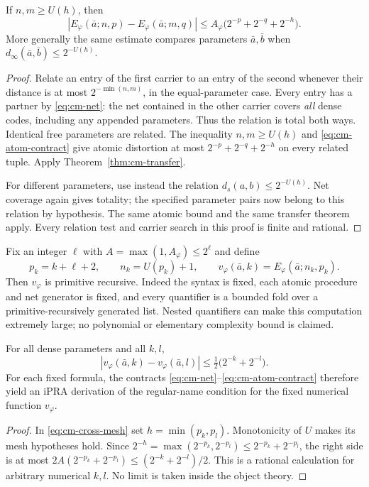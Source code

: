 \begin{theorem}
\label{thm:cm-cross-mesh}
If $n,m\geq U(h)$, then
\begin{equation}
 |E_\varphi(\bar a;n,p)-E_\varphi(\bar a;m,q)|
 \leq A_\varphi\bigl(2^{-p}+2^{-q}+2^{-h}\bigr).
 \label{eq:cm-cross-mesh}
\end{equation}
More generally the same estimate compares parameters $\bar a,\bar b$
when $d_\infty(\bar a,\bar b)\leq2^{-U(h)}$.
\end{theorem}
\begin{proof}
Relate an entry of the first carrier to an entry of the second whenever
their distance is at most $2^{-\min(n,m)}$, in the equal-parameter
case. Every entry has a partner by \eqref{eq:cm-net}: the net contained
in the other carrier covers \emph{all} dense codes, including any
appended parameters. Thus the relation is total both ways.
Identical free parameters are related.
The inequality $n,m\geq U(h)$ and
\eqref{eq:cm-atom-contract} give atomic distortion at most
$2^{-p}+2^{-q}+2^{-h}$ on every related tuple. Apply
Theorem~\ref{thm:cm-transfer}.

For different parameters, use instead the relation
$d_s(a,b)\leq2^{-U(h)}$. Net coverage again gives totality; the specified
parameter pairs now belong to this relation by hypothesis. The same
atomic bound and the same transfer theorem apply.
Every relation test and carrier search in this proof is finite and
rational.
\end{proof}

Fix an integer $\ell$ with $A=\max(1,A_\varphi)\leq2^\ell$ and define
\begin{equation}
 p_k=k+\ell+2,\qquad n_k=U(p_k)+1,\qquad
 v_\varphi(\bar a,k)=E_\varphi(\bar a;n_k,p_k).
 \label{eq:cm-canonical-value}
\end{equation}
Then $v_\varphi$ is primitive recursive. Indeed the syntax is fixed,
each atomic procedure and net generator is fixed, and every quantifier
is a bounded fold over a primitive-recursively generated list.
Nested quantifiers can make this computation extremely large; no
polynomial or elementary complexity bound is claimed.

\begin{corollary}
\label{cor:cm-cauchy}
For all dense parameters and all $k,l$,
\begin{equation}
 |v_\varphi(\bar a,k)-v_\varphi(\bar a,l)|
 \leq \tfrac12\bigl(2^{-k}+2^{-l}\bigr).
 \label{eq:cm-cauchy}
\end{equation}
For each fixed formula, the contracts
\eqref{eq:cm-net}--\eqref{eq:cm-atom-contract} therefore yield an iPRA
derivation of the regular-name condition for the fixed numerical
function $v_\varphi$.
\end{corollary}
\begin{proof}
In \eqref{eq:cm-cross-mesh} set $h=\min(p_k,p_l)$.
Monotonicity of $U$ makes its mesh hypotheses hold. Since
$2^{-h}=\max(2^{-p_k},2^{-p_l})\leq2^{-p_k}+2^{-p_l}$, the right side
is at most
$2A(2^{-p_k}+2^{-p_l})
\leq(2^{-k}+2^{-l})/2$.
This is a rational calculation for arbitrary numerical $k,l$.
No limit is taken inside the object theory.
\end{proof}

